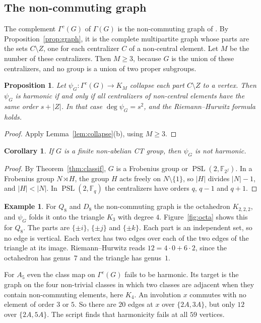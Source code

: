 \documentclass[12pt,letterpaper]{article}
\numberwithin{equation}{section}
\theoremstyle{plain}
\newtheorem{proposition}[theorem]{Proposition}
\newtheorem{corollary}[theorem]{Corollary}
\theoremstyle{definition}
\newtheorem{example}[theorem]{Example}
\newcommand{\F}{\mathbb{F}}
\DeclareMathOperator{\PSL}{PSL}
\begin{document}
\subsection{The non-commuting graph}

The complement $\Gamma^c(G)$ of $\Gamma(G)$ is the non-commuting graph of
\cite{AAM06}. By Proposition~\ref{prop:graph}, it is the complete
multipartite graph whose parts are the sets $C\setminus Z$, one for each
centralizer $C$ of a non-central element. Let $M$ be the number of these
centralizers. Then $M\ge3$, because $G$ is the union of these centralizers,
and no group is a union of two proper subgroups.

\begin{proposition}\label{prop:noncommharm}
Let $\psi_G\colon\Gamma^c(G)\to K_M$ collapse each part $C\setminus Z$ to a
vertex. Then $\psi_G$ is harmonic if and only if all centralizers of
non-central elements have the same order $s+|Z|$. In that case
$\deg \psi_G=s^2$, and the Riemann--Hurwitz formula holds.
\end{proposition}

\begin{proof}
Apply Lemma~\ref{lem:collapse}(b), using $M\ge3$.
\end{proof}

\begin{corollary}\label{cor:noncommct}
If $G$ is a finite non-abelian CT group, then $\psi_G$ is not harmonic.
\end{corollary}

\begin{proof}
By Theorem~\ref{thm:classif}, $G$ is a Frobenius group or
$\PSL(2,\F_{2^f})$. In a Frobenius group $N\rtimes H$, the group $H$ acts
freely on $N\setminus\{1\}$, so $|H|$ divides $|N|-1$, and $|H|<|N|$. In
$\PSL(2,\F_q)$ the centralizers have orders $q$, $q-1$ and $q+1$.
\end{proof}

\begin{example}\label{ex:octahedron}
For $Q_8$ and $D_8$ the non-commuting graph is the octahedron
$K_{2,2,2}$, and $\psi_G$ folds it onto the triangle $K_3$ with degree $4$.
Figure~\ref{fig:octa} shows this for $Q_8$. The parts are $\{\pm i\}$,
$\{\pm j\}$ and $\{\pm k\}$. Each part is an independent set, so no edge is
vertical. Each vertex has two edges over each of the two edges of the
triangle at its image. Riemann--Hurwitz reads $12=4\cdot0+6\cdot2$, since the
octahedron has genus~$7$ and the triangle has genus~$1$.

For $A_5$ even the class map on $\Gamma^c(G)$ fails to be harmonic. Its
target is the graph on the four non-trivial classes in which two classes are
adjacent when they contain non-commuting elements, here $K_4$. An
involution $x$ commutes with no element of order $3$ or $5$. So there are
$20$ edges at $x$ over $\{2A,3A\}$, but only $12$ over $\{2A,5A\}$. The
script finds that harmonicity fails at all $59$ vertices.
\end{example}
\end{document}
